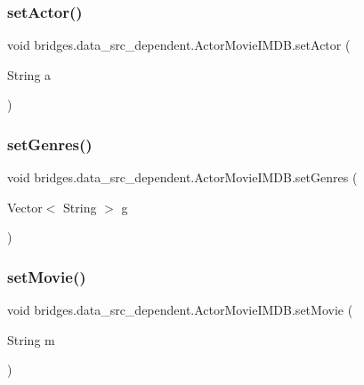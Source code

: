 \subsubsection{\texorpdfstring{set\+Actor()}{setActor()}}
{\footnotesize\ttfamily void bridges.\+data\+\_\+src\+\_\+dependent.\+Actor\+Movie\+I\+M\+D\+B.\+set\+Actor (\begin{DoxyParamCaption}\item[{String}]{a }\end{DoxyParamCaption})}

\hypertarget{classbridges_1_1data__src__dependent_1_1_actor_movie_i_m_d_b_a52f0162b1e946d8bbcd9106274dc2ad3}{}\label{classbridges_1_1data__src__dependent_1_1_actor_movie_i_m_d_b_a52f0162b1e946d8bbcd9106274dc2ad3} 
\subsubsection{\texorpdfstring{set\+Genres()}{setGenres()}}
{\footnotesize\ttfamily void bridges.\+data\+\_\+src\+\_\+dependent.\+Actor\+Movie\+I\+M\+D\+B.\+set\+Genres (\begin{DoxyParamCaption}\item[{Vector$<$ String $>$}]{g }\end{DoxyParamCaption})}

\hypertarget{classbridges_1_1data__src__dependent_1_1_actor_movie_i_m_d_b_a4747fd2c81481d366d566a6536186d9e}{}\label{classbridges_1_1data__src__dependent_1_1_actor_movie_i_m_d_b_a4747fd2c81481d366d566a6536186d9e} 
\subsubsection{\texorpdfstring{set\+Movie()}{setMovie()}}
{\footnotesize\ttfamily void bridges.\+data\+\_\+src\+\_\+dependent.\+Actor\+Movie\+I\+M\+D\+B.\+set\+Movie (\begin{DoxyParamCaption}\item[{String}]{m }\end{DoxyParamCaption})}

